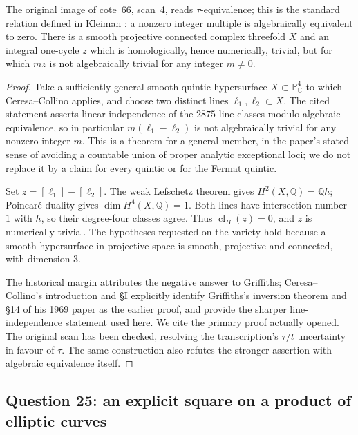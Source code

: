 \begin{theorem}\label{B:tau}
The original image of cote~66, scan~4, reads $\tau$-equivalence; this is the standard relation defined in Kleiman \cite[\S1.1, p.~362]{BKleiman1968}: a nonzero integer multiple is algebraically equivalent to zero. There is a smooth projective connected complex threefold $X$ and an integral one-cycle $z$ which is homologically, hence numerically, trivial, but for which $mz$ is not algebraically trivial for any integer $m\ne0$.
\end{theorem}
\begin{proof}
Take a sufficiently general smooth quintic hypersurface $X\subset\mathbb P^4_{\mathbb C}$ to which Ceresa--Collino \cite[\S III, (3.3)]{BCeresaCollino1983} applies, and choose two distinct lines $\ell_1,\ell_2\subset X$. The cited statement asserts linear independence of the $2875$ line classes modulo algebraic equivalence, so in particular $m(\ell_1-\ell_2)$ is not algebraically trivial for any nonzero integer $m$. This is a theorem for a general member, in the paper's stated sense of avoiding a countable union of proper analytic exceptional loci; we do not replace it by a claim for every quintic or for the Fermat quintic.

Set $z=[\ell_1]-[\ell_2]$. The weak Lefschetz theorem gives $H^2(X,\mathbb Q)=\mathbb Qh$; Poincar\'e duality gives $\dim H^4(X,\mathbb Q)=1$. Both lines have intersection number $1$ with $h$, so their degree-four classes agree. Thus $\operatorname{cl}_B(z)=0$, and $z$ is numerically trivial. The hypotheses requested on the variety hold because a smooth hypersurface in projective space is smooth, projective and connected, with dimension $3$.

The historical margin attributes the negative answer to Griffiths; Ceresa--Collino's introduction and \S I explicitly identify Griffiths's inversion theorem and \S14 of his 1969 paper as the earlier proof, and provide the sharper line-independence statement used here. We cite the primary proof actually opened. The original scan has been checked, resolving the transcription's $\tau/t$ uncertainty in favour of $\tau$. The same construction also refutes the stronger assertion with algebraic equivalence itself.
\end{proof}

\subsection{Question 25: an explicit square on a product of elliptic curves}

